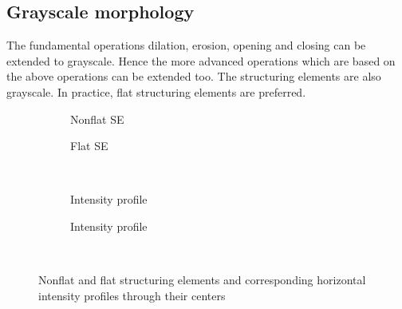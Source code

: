 \subsection{Grayscale morphology}
The fundamental operations dilation, erosion, opening and closing can be extended to grayscale. Hence the more advanced operations which are based on the above operations can be extended too. The structuring elements are also grayscale. In practice, flat structuring elements are preferred.

\begin{figure}[h!]
\centering
\begin{subfigure}[b]{0.45\textwidth}
\centering
{}
\caption{Nonflat SE}
\end{subfigure}
\begin{subfigure}[b]{0.45\textwidth}
\centering
{}
\caption{Flat SE}
\end{subfigure}\\
\begin{subfigure}[b]{0.45\textwidth}
\centering
{}
\caption{Intensity profile}
\end{subfigure}
\begin{subfigure}[b]{0.45\textwidth}
\centering
{}
\caption{Intensity profile}
\end{subfigure}\\
\caption{Nonflat and flat structuring elements and corresponding horizontal intensity profiles through their centers}
\end{figure}


